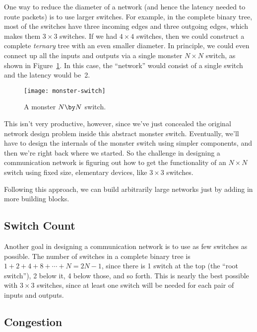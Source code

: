 One way to reduce the diameter of a network (and hence the latency
needed to route packets) is to use larger switches.  For example, in
the complete binary tree, most of the switches have three incoming
edges and three outgoing edges, which makes them $3 \times 3$
switches.  If we had $4 \times 4$ switches, then we could construct a
complete \emph{ternary} tree with an even smaller diameter.  In
principle, we could even connect up all the inputs and outputs via a
single monster $N \times N$ switch, as shown in Figure~\ref{fig:6EI}.
In this case, the ``network'' would consist of a single switch and the
latency would be~2.

\begin{figure}


\texttt{[image: monster-switch]}

\caption{A monster $N \by N$ switch.}

\label{fig:6EI}

\end{figure}

This isn't very productive, however, since we've just concealed the
original network design problem inside this abstract monster switch.
Eventually, we'll have to design the internals of the monster switch
using simpler components, and then we're right back where we started.
So the challenge in designing a communication network is figuring out
how to get the functionality of an $N \times N$ switch using fixed
size, elementary devices, like $3 \times 3$ switches.
\begin{solution}
Following this approach, we can build arbitrarily large networks
just by adding in more building blocks. 
\end{solution}

\subsection{Switch Count}

Another goal in designing a communication network is to use as few
switches as possible.  The number of switches in a complete binary
tree is $1 + 2 + 4 + 8 + \cdots + N = 2N - 1$, since there is 1 switch
at the top (the ``root switch''), 2 below it, 4 below those, and so
forth.  This is nearly the best possible with $3 \times 3$ switches,
since at least one switch will be needed for each pair of inputs and
outputs.

\subsection{Congestion}

